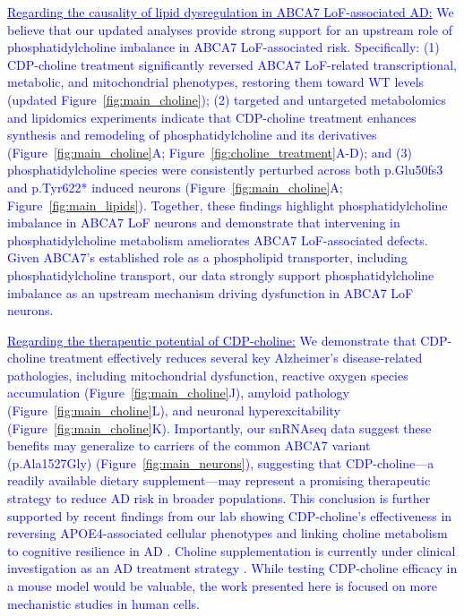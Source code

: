 \documentclass[12pt]{article}
\begin{document}
\textcolor{blue}{\underline{Regarding the causality of lipid dysregulation in ABCA7 LoF-associated AD:} We believe that our updated analyses provide strong support for an upstream role of phosphatidylcholine imbalance in ABCA7 LoF-associated risk. Specifically: (1) CDP-choline treatment significantly reversed ABCA7 LoF-related transcriptional, metabolic, and mitochondrial phenotypes, restoring them toward WT levels (updated Figure~\ref{fig:main_choline}); (2) targeted and untargeted metabolomics and lipidomics experiments indicate that CDP-choline treatment enhances synthesis and remodeling of phosphatidylcholine and its derivatives (Figure~\ref{fig:main_choline}A; Figure~\ref{fig:choline_treatment}A-D); and (3) phosphatidylcholine species were consistently perturbed across both p.Glu50fs3 and p.Tyr622* induced neurons (Figure~\ref{fig:main_choline}A; Figure~\ref{fig:main_lipids}). Together, these findings highlight phosphatidylcholine imbalance in ABCA7 LoF neurons and demonstrate that intervening in phosphatidylcholine metabolism ameliorates ABCA7 LoF-associated defects. Given ABCA7’s established role as a phospholipid transporter, including phosphatidylcholine transport, our data strongly support phosphatidylcholine imbalance as an upstream mechanism driving dysfunction in ABCA7 LoF neurons.}

\textcolor{blue}{\underline{Regarding the therapeutic potential of CDP-choline:} We demonstrate that CDP-choline treatment effectively reduces several key Alzheimer’s disease-related pathologies, including mitochondrial dysfunction, reactive oxygen species accumulation (Figure~\ref{fig:main_choline}J), amyloid pathology (Figure~\ref{fig:main_choline}L), and neuronal hyperexcitability (Figure~\ref{fig:main_choline}K). Importantly, our snRNAseq data suggest these benefits may generalize to carriers of the common ABCA7 variant (p.Ala1527Gly) (Figure~\ref{fig:main_neurons}), suggesting that CDP-choline—a readily available dietary supplement—may represent a promising therapeutic strategy to reduce AD risk in broader populations. This conclusion is further supported by recent findings from our lab showing CDP-choline’s effectiveness in reversing APOE4-associated cellular phenotypes \cite{Sienski2021-zt} and linking choline metabolism to cognitive resilience in AD \cite{Mathys2024-ex}. Choline supplementation is currently under clinical investigation as an AD treatment strategy \cite{Cummings2024-cu}. While testing CDP-choline efficacy in a mouse model would be valuable, the work presented here is focused on more mechanistic studies in human cells.}
\end{document}
